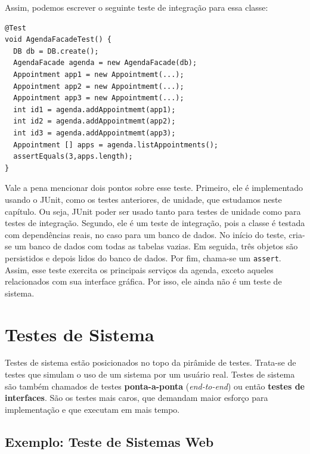 \documentclass[
  11pt,
  twoside]{book}
\newcommand{\passthrough}[1]{#1}
\begin{document}
Assim, podemos escrever o seguinte teste de integração para essa classe:

\newpage

\begin{lstlisting}
@Test
void AgendaFacadeTest() {
  DB db = DB.create();
  AgendaFacade agenda = new AgendaFacade(db);
  Appointment app1 = new Appointmemt(...);
  Appointment app2 = new Appointmemt(...);
  Appointment app3 = new Appointmemt(...);
  int id1 = agenda.addAppointmemt(app1);
  int id2 = agenda.addAppointmemt(app2);
  int id3 = agenda.addAppointmemt(app3);
  Appointment [] apps = agenda.listAppointments();
  assertEquals(3,apps.length);
}
\end{lstlisting}

Vale a pena mencionar dois pontos sobre esse teste. Primeiro, ele é
implementado usando o JUnit, como os testes anteriores, de unidade, que
estudamos neste capítulo. Ou seja, JUnit poder ser usado tanto para
testes de unidade como para testes de integração. Segundo, ele é um
teste de integração, pois a classe é testada com dependências reais, no
caso para um banco de dados. No início do teste, cria-se um banco de
dados com todas as tabelas vazias. Em seguida, três objetos são
persistidos e depois lidos do banco de dados. Por fim, chama-se um
\passthrough{\lstinline!assert!}. Assim, esse teste exercita os
principais serviços da agenda, exceto aqueles relacionados com sua
interface gráfica. Por isso, ele ainda não é um teste de sistema.

\hypertarget{testes-de-sistema}{%
\section{Testes de Sistema}\label{testes-de-sistema}}

 

Testes de sistema estão posicionados no topo da pirâmide de testes.
Trata-se de testes que simulam o uso de um sistema por um usuário real.
Testes de sistema são também chamados de testes \textbf{ponta-a-ponta}
(\emph{end-to-end}) ou então \textbf{testes de interfaces}. São os
testes mais caros, que demandam maior esforço para implementação e que
executam em mais tempo.

\hypertarget{exemplo-teste-de-sistemas-web}{%
\subsection{Exemplo: Teste de Sistemas
Web}\label{exemplo-teste-de-sistemas-web}}
\end{document}
